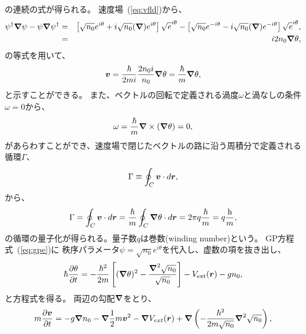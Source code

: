 \documentclass[12pt,a4paper]{jbook}
\newcommand{\h}  {{\rm h}}				%
\def\Vec#1{\mbox{\boldmath $#1$}}			%
\begin{document}
        の連続の式が得られる。
        速度場~(\ref{eq:vfld})から、
        \begin{eqnarray}
            \psi^\dagger \Vec{\nabla} \psi - \psi \Vec{\nabla} \psi^\dagger
            & = & \left[ 
                \sqrt{n_0} e^{i \theta} + i \sqrt{n_0} (\Vec{\nabla} )e^{i \theta} 
            \right] \sqrt e^{i \theta}
            - \left[
                \sqrt{n_0} e^{-i \theta} - i \sqrt{n_0} ( \Vec{\nabla} )e^{-i \theta}
            \right] \sqrt e^{i \theta}, \nonumber
            \\
            & = & i 2 n_0 \Vec{\nabla} \theta,
        \end{eqnarray}
        の等式を用いて、
        \begin{eqnarray}
            \Vec{v} = \frac{\hbar}{2m i}\frac{2 n_0 i}{n_0} \Vec{\nabla} \theta = \frac{\hbar}{m}\Vec{\nabla} \theta,
        \end{eqnarray}
        と示すことができる。
        また、ベクトルの回転で定義される渦度$\omega$と渦なしの条件$\omega = 0$から、
        \begin{eqnarray}
            \omega = \frac{\hbar}{m} \Vec{\nabla} \times \left( \Vec{\nabla} \theta \right) = 0,
        \end{eqnarray}
        があらわすことができ、速度場で閉じたベクトルの路に沿う周積分で定義される循環$\Gamma$、
        \begin{eqnarray}
            \Gamma \equiv \oint_C \Vec{v} \cdot d \Vec{r},
        \end{eqnarray}
        から、
        \begin{eqnarray}
            \Gamma = \oint_C \Vec{v} \cdot d \Vec{r} = \frac{\hbar}{m} \oint_C \Vec{\nabla} \theta \cdot d \Vec{r} = 2 \pi q \frac{\hbar}{m}
            = q \frac{\h}{m},
        \end{eqnarray}
        の循環の量子化が得られる。量子数$q$は巻数(winding number)という。
        GP方程式~(\ref{eq:gpe})に
        秩序パラメータ$\psi=\sqrt{n_0}e^{i \theta}$を代入し、虚数の項を抜き出し、
        \begin{eqnarray}
            \label{eq:igpe}
            \hbar \frac{\partial \theta}{\partial t} = - \frac{\hbar^2}{2m} \left[
                (\Vec{\nabla}\theta)^2 - \frac{\Vec{\nabla}^2 \sqrt{n_0}}{\sqrt{n_0}}
            \right]
            - V_{\rm ext}(\Vec{r}) - gn_0,
        \end{eqnarray}
        と方程式を得る。
        両辺の勾配$\Vec{\nabla}$をとり、
        \begin{eqnarray}
            \label{eq:qeuler}
            m \frac{\partial \Vec{v}}{\partial t} =
            - g \Vec{\nabla}n_0 - \Vec{\nabla} \frac{1}{2} m\Vec{v}^2 -  \Vec{\nabla} V_{ext}(\Vec{r}) + 
            \Vec{\nabla} \left( - \frac{\hbar^2}{2 m \sqrt{n_0}} \Vec{\nabla}^2 \sqrt{n_0} \right),
        \end{eqnarray}
\end{document}

